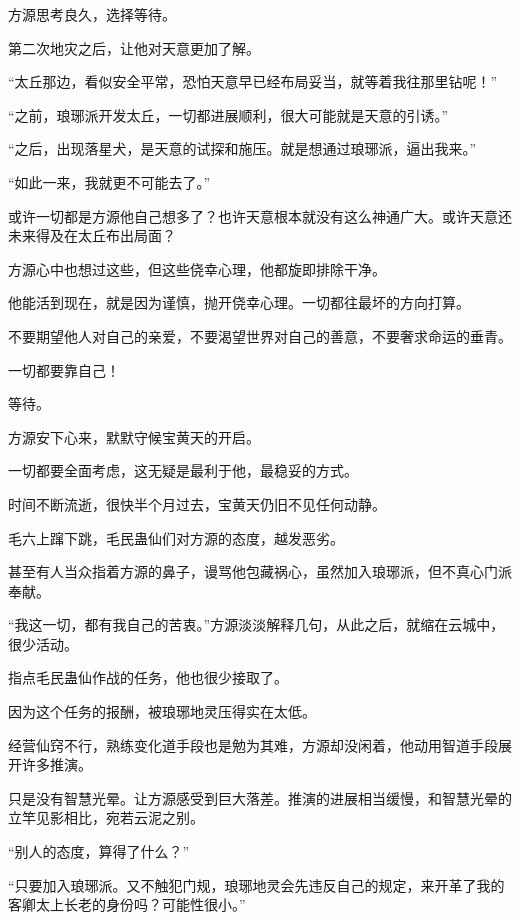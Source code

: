 
\begin{this_body}



方源思考良久，选择等待。

第二次地灾之后，让他对天意更加了解。

“太丘那边，看似安全平常，恐怕天意早已经布局妥当，就等着我往那里钻呢！”

“之前，琅琊派开发太丘，一切都进展顺利，很大可能就是天意的引诱。”

“之后，出现落星犬，是天意的试探和施压。就是想通过琅琊派，逼出我来。”

“如此一来，我就更不可能去了。”

或许一切都是方源他自己想多了？也许天意根本就没有这么神通广大。或许天意还未来得及在太丘布出局面？

方源心中也想过这些，但这些侥幸心理，他都旋即排除干净。

他能活到现在，就是因为谨慎，抛开侥幸心理。一切都往最坏的方向打算。

不要期望他人对自己的亲爱，不要渴望世界对自己的善意，不要奢求命运的垂青。

一切都要靠自己！

等待。

方源安下心来，默默守候宝黄天的开启。

一切都要全面考虑，这无疑是最利于他，最稳妥的方式。

时间不断流逝，很快半个月过去，宝黄天仍旧不见任何动静。

毛六上蹿下跳，毛民蛊仙们对方源的态度，越发恶劣。

甚至有人当众指着方源的鼻子，谩骂他包藏祸心，虽然加入琅琊派，但不真心门派奉献。

“我这一切，都有我自己的苦衷。”方源淡淡解释几句，从此之后，就缩在云城中，很少活动。

指点毛民蛊仙作战的任务，他也很少接取了。

因为这个任务的报酬，被琅琊地灵压得实在太低。

经营仙窍不行，熟练变化道手段也是勉为其难，方源却没闲着，他动用智道手段展开许多推演。

只是没有智慧光晕。让方源感受到巨大落差。推演的进展相当缓慢，和智慧光晕的立竿见影相比，宛若云泥之别。

“别人的态度，算得了什么？”

“只要加入琅琊派。又不触犯门规，琅琊地灵会先违反自己的规定，来开革了我的客卿太上长老的身份吗？可能性很小。”


\end{this_body}

